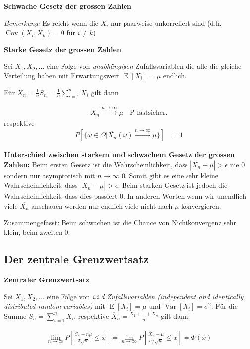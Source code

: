 \documentclass[25pt]{sciposter}
\newcommand{\Var}{\operatorname{Var}}
\newcommand{\E}{\operatorname{E}}
\newenvironment{method}[1]{\begin{mdframed}[backgroundcolor=blue!10,innertopmargin=15pt, innerbottommargin=15pt,nobreak=true]
		\textbf{#1 }
	}
	{ 
	\end{mdframed}
}
\begin{document}
\begin{multicols}{3}
\begin{method}{Schwache Gesetz der grossen Zahlen}
	\textit{Bemerkung:} Es reicht wenn die $X_i$ nur paarweise unkorreliert sind (d.h. $\operatorname{Cov}(X_i,X_k) = 0$ für $i \neq k$)
	
\end{method}


\begin{method}{Starke Gesetz der grossen Zahlen}
	Sei $X_1,X_2,\ldots$ eine Folge von \textit{unabhängigen} Zufallsvariablen die alle die gleiche Verteilung haben mit Erwartungswert $\E[X_i] = \mu$ endlich. 
	
	Für $\overline{X}_n = \frac{1}{n}S_n = \frac{1}{n} \sum_{i=1}^{n} X_i$ gilt dann 
	
	\begin{align*}
		\overline{X_n} \stackrel{n \to \infty}{\longrightarrow} \mu \quad \text{P-fastsicher}.
	\end{align*}  
	respektive
	\begin{align*}
	P\left[ \{ \omega \in \Omega | \overline{X_n}(\omega)  \stackrel{n \to \infty}{\longrightarrow}  \mu  \} \right] &= 1
	\end{align*}
\end{method}

\textbf{Unterschied zwischen starkem und schwachem Gesetz der grossen Zahlen:} Beim ersten Gesetz ist die Wahrscheinlichkeit, dass $|\overline{X}_n - \mu|> \epsilon$ nie 0 sondern nur asymptotisch mit $n \to \infty$ 0. Somit gibt es eine sehr kleine Wahrscheinlichkeit, dass $|\overline{X}_n - \mu| > \epsilon$. Beim starken Gesetz ist jedoch die Wahrscheinlichkeit, dass dies passiert 0. In anderen Worten wenn wir unendlich viele $\overline{X_n}$ anschauen werden nur endlich viele nicht nach $\mu$ konvergieren.

Zusammengefasst: Beim schwachen ist die Chance von Nichtkonvergenz sehr klein, beim zweiten 0.

\subsection*{Der zentrale Grenzwertsatz}


\begin{method}{Zentraler Grenzwertsatz}
	Sei $X_1,X_2,\ldots$ eine Folge von \textit{i.i.d Zufallsvariablen (independent and identically distributed random variables)} mit $\E[X_i] = \mu$ und $\Var[X_i] = \sigma^2$. Für die Summe $S_n = \sum_{i=1}^{n} X_i$, respektive $\overline {X}_{n}={\frac  {X_{1}+\cdots +X_{n}}n}$ gilt dann:
	
	\begin{align*}
		\lim\limits_{n \to \infty} P\left[ \frac{S_n - n\mu}{\sigma \sqrt{n}} \leq x\right] = \lim _{{n\rightarrow \infty }}P\left[{\frac  {\overline {X}_{n}-\mu }{\sigma /{\sqrt  {n}}}}\leq x\right]= \Phi(x)
	\end{align*}


\end{method}
\end{multicols}
\end{document}

